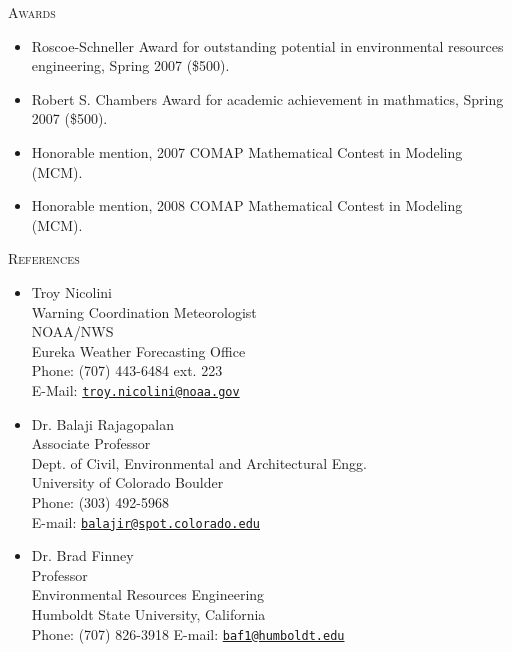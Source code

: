 \documentclass[11pt,oneside]{article}
\newenvironment{ressection}[1]{
	\vspace{3pt}
	{\Large#1}
	\begin{itemize}
	\vspace{2pt}
}{
	\end{itemize}
}
\newcommand{\resitem}[1]{
	\vspace{-4pt}
	\item \begin{flushleft} #1 \end{flushleft}
}
\begin{document}
\newpage
\begin{ressection}{\scshape Awards}

	\resitem{Roscoe-Schneller Award for outstanding potential in environmental resources engineering, Spring 2007 (\$500).}

	\resitem{Robert S. Chambers Award for academic achievement in mathmatics, Spring 2007 (\$500).}

	\resitem{Honorable mention, 2007 COMAP Mathematical Contest in Modeling (MCM).}
	
	\resitem{Honorable mention, 2008 COMAP Mathematical Contest in Modeling (MCM).}


\end{ressection}

\begin{ressection}{\scshape References}

\resitem{Troy Nicolini\\
Warning Coordination Meteorologist\\
NOAA/NWS\\
Eureka Weather Forecasting Office\\
Phone: (707) 443-6484 ext. 223\\
E-Mail: \href{mailto:troy.nicolini@noaa.gov}{\texttt{troy.nicolini@noaa.gov}}}

\resitem{Dr. Balaji Rajagopalan\\
Associate Professor\\
Dept. of Civil, Environmental and Architectural Engg.\\
University of Colorado Boulder\\
Phone: (303) 492-5968\\
E-mail: \href{mailto:balajir@spot.colorado.edu}{\texttt{balajir@spot.colorado.edu}}}

\resitem{Dr. Brad Finney\\
Professor\\
Environmental Resources Engineering\\
Humboldt State University, California\\
Phone: (707) 826-3918
E-mail: \href{mailto:baf1@humboldt.edu}{\texttt{baf1@humboldt.edu}}}

\end{ressection}
\end{document}
